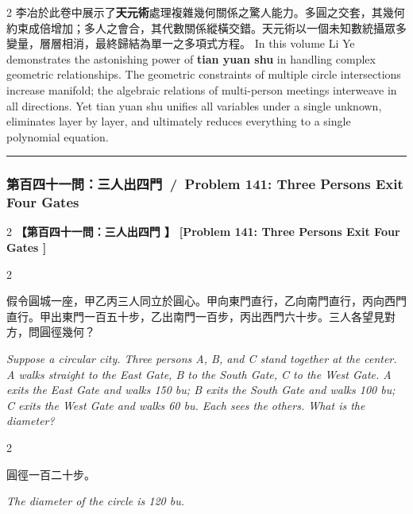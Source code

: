 \documentclass[11pt,a4paper]{article}
\newcommand{\longline}{\noindent\rule{\textwidth}{0.4pt}}
\newcommand{\wenC}[1]{\par\noindent{\color{probcolor}\textbf{問：}}#1\par}
\newcommand{\daC}[1]{\par\noindent{\color{anscolor}\textbf{答曰：}}#1\par}
\newcommand{\wenE}[1]{\par\noindent{\color{probcolor}\textbf{Wen (Problem): }}\textit{#1}\par}
\newcommand{\daE}[1]{\par\noindent{\color{anscolor}\textbf{Da (Answer): }}\textit{#1}\par}
\newcommand{\problemheader}[2]{\subsubsection*{#1\ /\ #2}}
\begin{document}
\vspace{0.3cm}

\begin{paracol}{2}
李冶於此卷中展示了\textbf{天元術}處理複雜幾何關係之驚人能力。多圓之交套，其幾何約束成倍增加；多人之會合，其代數關係縱橫交錯。天元術以一個未知數統攝眾多變量，層層相消，最終歸結為單一之多項式方程。
\switchcolumn
In this volume Li Ye demonstrates the astonishing power of \textbf{tian yuan shu} in handling complex geometric relationships. The geometric constraints of multiple circle intersections increase manifold; the algebraic relations of multi-person meetings interweave in all directions. Yet tian yuan shu unifies all variables under a single unknown, eliminates layer by layer, and ultimately reduces everything to a single polynomial equation.
\end{paracol}

\vspace{0.5cm}
\longline


\problemheader{第百四十一問：三人出四門}{Problem 141: Three Persons Exit Four Gates}

\begin{paracol}{2}
\noindent\textbf{\color{probcolor}【第百四十一問：三人出四門 】}
\switchcolumn
\noindent\textbf{\color{probcolor}[Problem 141: Three Persons Exit Four Gates ]}
\end{paracol}

\vspace{0.2cm}

\begin{paracol}{2}
\wenC{假令圓城一座，甲乙丙三人同立於圓心。甲向東門直行，乙向南門直行，丙向西門直行。甲出東門一百五十步，乙出南門一百步，丙出西門六十步。三人各望見對方，問圓徑幾何？}
\switchcolumn
\wenE{Suppose a circular city. Three persons A, B, and C stand together at the center. A walks straight to the East Gate, B to the South Gate, C to the West Gate. A exits the East Gate and walks 150 bu; B exits the South Gate and walks 100 bu; C exits the West Gate and walks 60 bu. Each sees the others. What is the diameter?}
\end{paracol}

\vspace{0.2cm}

\begin{paracol}{2}
\daC{圓徑一百二十步。}
\switchcolumn
\daE{The diameter of the circle is 120 bu.}
\end{paracol}
\end{document}
